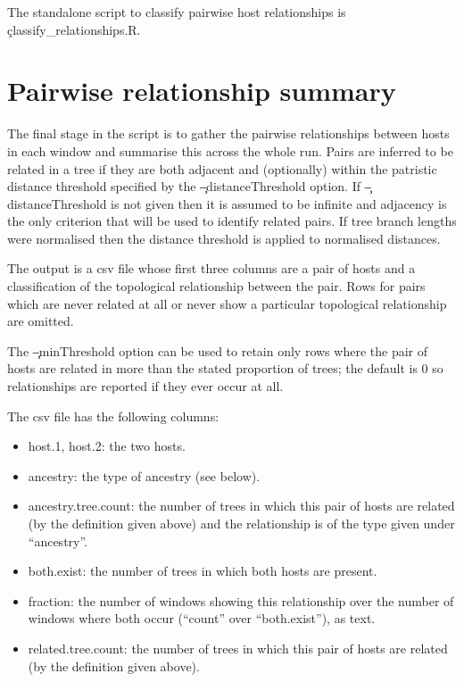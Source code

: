 The standalone script to classify pairwise host relationships is \c{classify\_relationships.R}.

\section{Pairwise relationship summary}\label{sec:ClassificationSummary}

The final stage in the script is to gather the pairwise relationships between hosts in each window and summarise this across the whole run.
Pairs are inferred to be related in a tree if they are both adjacent and (optionally) within the patristic distance threshold specified by the \c{--distanceThreshold} option.
If \c{--distanceThreshold} is not given then it is assumed to be infinite and adjacency is the only criterion that will be used to identify related pairs.
If tree branch lengths were normalised then the distance threshold is applied to normalised distances.

The output is a csv file whose first three columns are a pair of hosts and a classification of the topological relationship between the pair.
Rows for pairs which are never related at all or never show a particular topological relationship are omitted.

The \c{--minThreshold} option can be used to retain only rows where the pair of hosts are related in more than the stated proportion of trees; the default is 0 so relationships are reported if they ever occur at all.

The csv file has the following columns:
\begin{itemize}
\item host.1, host.2: the two hosts.
\item ancestry: the type of ancestry (see below).
\item ancestry.tree.count: the number of trees in which this pair of hosts are related (by the definition given above) and the relationship is of the type given under ``ancestry''.
\item both.exist: the number of trees in which both hosts are present.
\item fraction: the number of windows showing this relationship over the number of windows where both occur (``count'' over ``both.exist''), as text.
\item related.tree.count: the number of trees in which this pair of hosts are related (by the definition given above).
\end{itemize}

